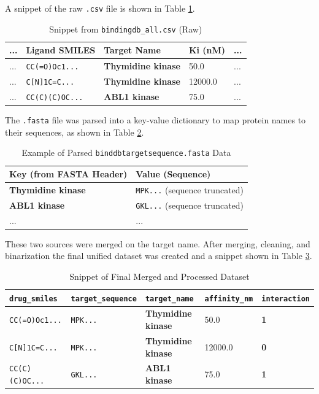 A snippet of the raw \texttt{.csv} file is shown in Table \ref{tab:raw_csv}.
\begin{table}[H]
  \centering
  \caption{Snippet from \texttt{bindingdb\_all.csv} (Raw)}
  \label{tab:raw_csv}
  \begin{tabular}{l l l l l}
    \toprule
    ... & Ligand SMILES & \textbf{Target Name} & Ki (nM) & ... \\
    \midrule
    ... & \texttt{CC(=O)Oc1...} & \textbf{Thymidine kinase} & 50.0 & ... \\
    ... & \texttt{C[N]1C=C...} & \textbf{Thymidine kinase} & 12000.0 & ... \\
    ... & \texttt{CC(C)(C)OC...} & \textbf{ABL1 kinase} & 75.0 & ... \\
    \bottomrule
  \end{tabular}
\end{table}
The \texttt{.fasta} file was parsed into a key-value dictionary to map protein names to their sequences, as shown in Table \ref{tab:fasta_parsed}.
\begin{table}[H]
  \centering
  \caption{Example of Parsed \texttt{binddbtargetsequence.fasta} Data}
  \label{tab:fasta_parsed}
  \begin{tabular}{l l}
    \toprule
    Key (from FASTA Header) & Value (Sequence) \\
    \midrule
    \textbf{Thymidine kinase} & \texttt{MPK...} (sequence truncated) \\
    \textbf{ABL1 kinase}      & \texttt{GKL...} (sequence truncated) \\
    ...                       & ... \\
    \bottomrule
  \end{tabular}
\end{table}
These two sources were merged on the target name. After merging, cleaning, and binarization the final unified dataset was created and a snippet shown in Table \ref{tab:merged_data}.
\begin{table}[H]
  \centering
  \caption{Snippet of Final Merged and Processed Dataset}
  \label{tab:merged_data}
  \begin{tabular}{l l l l l}
    \toprule
    \texttt{drug\_smiles} & \texttt{target\_sequence} & \texttt{target\_name} & \texttt{affinity\_nm} & \texttt{interaction} \\
    \midrule
    \texttt{CC(=O)Oc1...} & \texttt{MPK...} & \textbf{Thymidine kinase} & 50.0 & \textbf{1} \\
    \texttt{C[N]1C=C...} & \texttt{MPK...} & \textbf{Thymidine kinase} & 12000.0 & \textbf{0} \\
    \texttt{CC(C)(C)OC...} & \texttt{GKL...} & \textbf{ABL1 kinase} & 75.0 & \textbf{1} \\
    \bottomrule
  \end{tabular}
\end{table}


